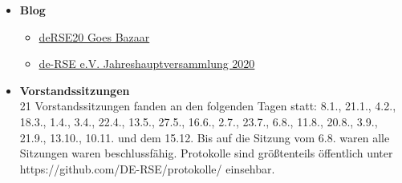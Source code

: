 \begin{itemize}
 \item \textbf{Blog}
 \begin{itemize}
  \item \href{https://de-rse.org/blog/2020/01/31/derse20-goes-bazaar.html}{deRSE20 Goes Bazaar}
  \item \href{https://de-rse.org/blog/2020/09/22/deRSE-MV.html}{de-RSE e.V. Jahreshauptversammlung 2020}
 \end{itemize}
 \item \textbf{Vorstandssitzungen}\\
  21 Vorstandssitzungen fanden an den folgenden Tagen statt: 8.1., 21.1., 4.2., 18.3., 1.4., 3.4., 22.4., 13.5., 27.5., 16.6., 2.7., 23.7., 6.8., 11.8., 20.8., 3.9., 21.9., 13.10., 10.11. und dem 15.12.
  Bis auf die Sitzung vom 6.8. waren alle Sitzungen waren beschlussfähig.
  Protokolle sind größtenteils öffentlich unter https://github.com/DE-RSE/protokolle/ einsehbar.
\end{itemize}




